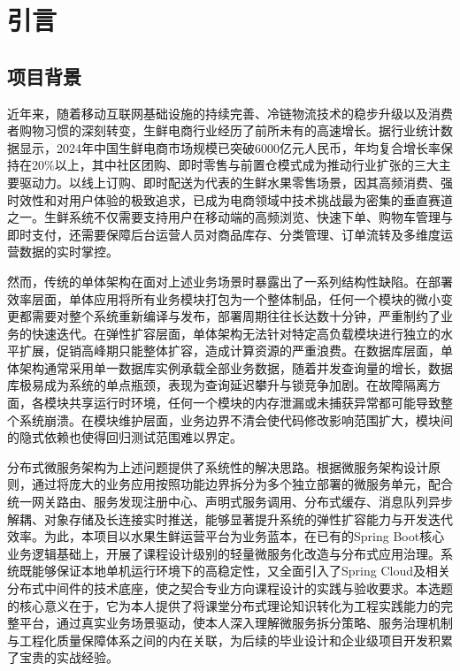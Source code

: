 
\chapter{引言}

\section{项目背景}

近年来，随着移动互联网基础设施的持续完善、冷链物流技术的稳步升级以及消费者购物习惯的深刻转变，生鲜电商行业经历了前所未有的高速增长。据行业统计数据显示，2024年中国生鲜电商市场规模已突破6000亿元人民币，年均复合增长率保持在20\%以上，其中社区团购、即时零售与前置仓模式成为推动行业扩张的三大主要驱动力。以线上订购、即时配送为代表的生鲜水果零售场景，因其高频消费、强时效性和对用户体验的极致追求，已成为电商领域中技术挑战最为密集的垂直赛道之一。生鲜系统不仅需要支持用户在移动端的高频浏览、快速下单、购物车管理与即时支付，还需要保障后台运营人员对商品库存、分类管理、订单流转及多维度运营数据的实时掌控。

然而，传统的单体架构在面对上述业务场景时暴露出了一系列结构性缺陷。在部署效率层面，单体应用将所有业务模块打包为一个整体制品，任何一个模块的微小变更都需要对整个系统重新编译与发布，部署周期往往长达数十分钟，严重制约了业务的快速迭代。在弹性扩容层面，单体架构无法针对特定高负载模块进行独立的水平扩展，促销高峰期只能整体扩容，造成计算资源的严重浪费。在数据库层面，单体架构通常采用单一数据库实例承载全部业务数据，随着并发查询量的增长，数据库极易成为系统的单点瓶颈，表现为查询延迟攀升与锁竞争加剧。在故障隔离方面，各模块共享运行时环境，任何一个模块的内存泄漏或未捕获异常都可能导致整个系统崩溃。在模块维护层面，业务边界不清会使代码修改影响范围扩大，模块间的隐式依赖也使得回归测试范围难以界定。

分布式微服务架构为上述问题提供了系统性的解决思路。根据微服务架构设计原则，通过将庞大的业务应用按照功能边界拆分为多个独立部署的微服务单元，配合统一网关路由、服务发现注册中心、声明式服务调用、分布式缓存、消息队列异步解耦、对象存储及长连接实时推送，能够显著提升系统的弹性扩容能力与开发迭代效率。为此，本项目以水果生鲜运营平台为业务蓝本，在已有的Spring Boot核心业务逻辑基础上，开展了课程设计级别的轻量微服务化改造与分布式应用治理。系统既能够保证本地单机运行环境下的高稳定性，又全面引入了Spring Cloud及相关分布式中间件的技术底座，使之契合专业方向课程设计的实践与验收要求。本选题的核心意义在于，它为本人提供了将课堂分布式理论知识转化为工程实践能力的完整平台，通过真实业务场景驱动，使本人深入理解微服务拆分策略、服务治理机制与工程化质量保障体系之间的内在关联，为后续的毕业设计和企业级项目开发积累了宝贵的实战经验。

